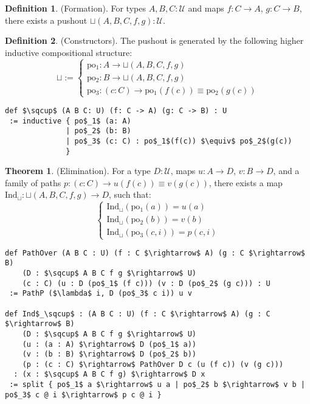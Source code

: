 \documentclass{article}
\theoremstyle{definition}
\newtheorem{theorem}{Theorem}
\newtheorem{definition}{Definition}
\begin{document}
\begin{definition} (Formation).
For types \( A, B, C : \mathcal{U} \) and maps \( f : C \to A \), \( g : C \to B \),
there exists a pushout \( \sqcup(A,B,C,f,g) : \mathcal{U} \).
\end{definition}

\begin{definition} (Constructors).
The pushout is generated by the following higher inductive compositional structure:
\[
\sqcup :=
\begin{cases}
\text{po$_1$} : A \to \sqcup(A,B,C,f,g) \\
\text{po$_2$} : B \to \sqcup(A,B,C,f,g) \\
\text{po$_3$} : (c : C) \to \text{po$_1$}(f(c)) \equiv \text{po$_2$}(g(c))
\end{cases}
\]
\begin{lstlisting}[mathescape=true]
def $\sqcup$ (A B C: U) (f: C -> A) (g: C -> B) : U
 := inductive { po$_1$ (a: A)
              | po$_2$ (b: B)
              | po$_3$ (c: C) : po$_1$(f(c)) $\equiv$ po$_2$(g(c))
              }
\end{lstlisting}
\end{definition}

\begin{theorem} (Elimination).
For a type \( D : \mathcal{U} \), maps \( u : A \to D \), \( v : B \to D \),
and a family of paths \( p : (c : C) \to u(f(c)) \equiv v(g(c)) \),
there exists a map \( \text{Ind}_\sqcup : \sqcup(A,B,C,f,g) \to D \), such that:
\[
\begin{cases}
\text{Ind}_\sqcup(\text{po$_1$}(a)) = u(a) \\
\text{Ind}_\sqcup(\text{po$_2$}(b)) = v(b) \\
\text{Ind}_\sqcup(\text{po$_3$}(c,i)) = p(c,i)
\end{cases}
\]
\begin{lstlisting}[mathescape=true]
def PathOver (A B C : U) (f : C $\rightarrow$ A) (g : C $\rightarrow$ B)
    (D : $\sqcup$ A B C f g $\rightarrow$ U)
    (c : C) (u : D (po$_1$ (f c))) (v : D (po$_2$ (g c))) : U
 := PathP ($\lambda$ i, D (po$_3$ c i)) u v

def Ind$_\sqcup$ : (A B C : U) (f : C $\rightarrow$ A) (g : C $\rightarrow$ B)
    (D : $\sqcup$ A B C f g $\rightarrow$ U)
    (u : (a : A) $\rightarrow$ D (po$_1$ a))
    (v : (b : B) $\rightarrow$ D (po$_2$ b))
    (p : (c : C) $\rightarrow$ PathOver D c (u (f c)) (v (g c)))
  : (x : $\sqcup$ A B C f g) $\rightarrow$ D x
 := split { po$_1$ a $\rightarrow$ u a | po$_2$ b $\rightarrow$ v b | po$_3$ c @ i $\rightarrow$ p c @ i }
\end{lstlisting}
\end{theorem}
\end{document}

